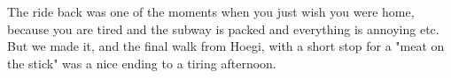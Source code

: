 \begin{post}
\begin{content}
The ride back was one of the moments when you just wish you were home, because you are tired and the subway is packed and everything is annoying etc. But we made it, and the final walk from Hoegi, with a short stop for a "meat on the stick" was a nice ending to a tiring afternoon.



	\end{content}
\end{post}
